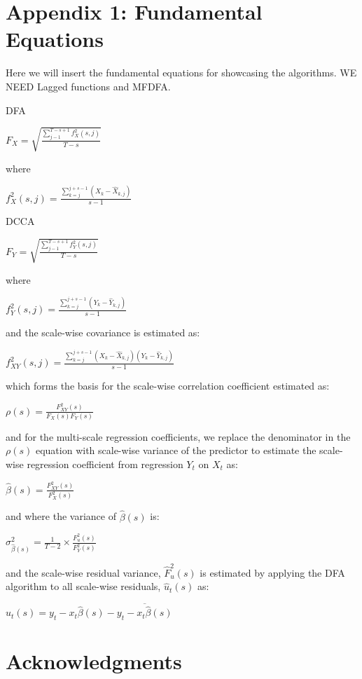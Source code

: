 \documentclass[
  man]{apa6}
\begin{document}
\hypertarget{appendix-1-fundamental-equations}{%
\section{Appendix 1: Fundamental Equations}\label{appendix-1-fundamental-equations}}

Here we will insert the fundamental equations for showcasing the
algorithms. WE NEED Lagged functions and MFDFA.

DFA

\(F_X = \sqrt{\frac{\sum^{T-s+1}_{j-1}f^2_X(s,j)}{T-s}}\)

where

\(f^2_X(s,j) = \frac{\sum^{j+s-1}_{k=j}(X_k -\widehat{X}_{k,j})}{s-1}\)

DCCA

\(F_Y = \sqrt{\frac{\sum^{T-s+1}_{j-1}f^2_Y(s,j)}{T-s}}\)

where

\(f^2_Y(s,j) = \frac{\sum^{j+s-1}_{k=j}(Y_k -\widehat{Y}_{k,j})}{s-1}\)

and the scale-wise covariance is estimated as:

\(f^2_{XY}(s,j) = \frac{\sum^{j+s-1}_{k=j}(X_k -\widehat{X}_{k,j})(Y_k -\widehat{Y}_{k,j})}{s-1}\)

which forms the basis for the scale-wise correlation coefficient
estimated as:

\(\rho(s) = \frac{F^2_{XY}(s)}{F_X(s)F_Y(s)}\)

and for the multi-scale regression coefficients, we replace the
denominator in the \(\rho(s)\) equation with scale-wise variance of the
predictor to estimate the scale-wise regression coefficient from
regression \(Y_t\) on \(X_t\) as:

\(\widehat{\beta}(s) = \frac{F^2_{XY}(s)}{F^2_X(s)}\)

and where the variance of \(\widehat{\beta}(s)\) is:

\(\sigma_{\widehat{\beta}(s)}^2 = \frac{1}{T-2} \times \frac{F^2_u(s)}{F^2_Y(s)}\)

and the scale-wise residual variance, \(\widehat{F}^2_u(s)\) is estimated
by applying the DFA algorithm to all scale-wise residuals,
\(\widehat{u}_t(s)\) as:

\(\widehat{u}_t(s) = y_t - x_t\widehat{\beta}(s) - \overline{y_t - x_t\widehat{\beta}(s)}\)

\hypertarget{acknowledgments}{%
\section{Acknowledgments}\label{acknowledgments}}
\end{document}
